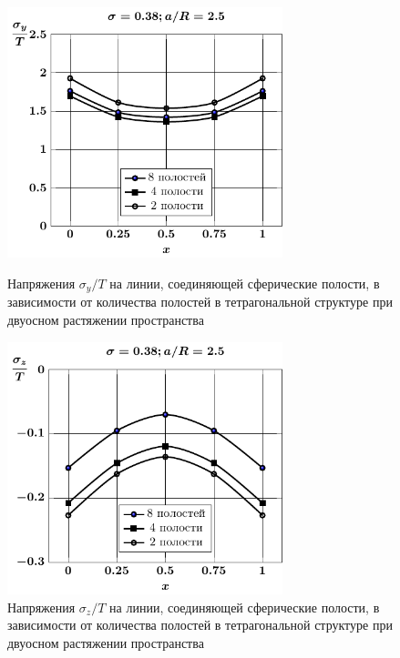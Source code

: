 \begin{figure}[h!]
\centering\footnotesize
\parbox[b]{7.5cm}{\centering\includegraphics[width=8cm]{cav8-4-2-sig_y-spheres-tension2.pdf}
\caption{Напряжения $\sigma_y/T$ на линии, соединяющей сферические полости, в зависимости от количества полостей в тетрагональной структуре при двуосном растяжении пространства
\label{f:8:12}}}\hfil\hfil
\parbox[b]{7.5cm}{\centering\includegraphics[width=8cm]{cav8-4-2-sig_z-spheres-tension2.pdf}
\caption{Напряжения $\sigma_z/T$ на линии, соединяющей сферические полости, в зависимости от количества полостей в тетрагональной структуре при двуосном растяжении пространства
\label{f:8:14}}}
\end{figure}

%

